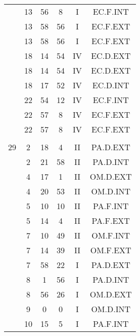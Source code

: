 \documentclass[12pt, a4paper]{article}
\begin{document}
\begin{multicols}{3}
{\begin{tabular}{c c c c c c}
	 	 	 	 & 13 & 56 & 8 & I & EC.F.INT\\%
	 	 	 	 & 13 & 58 & 56 & I & EC.F.EXT\\%
	 	 	 	 & 13 & 58 & 56 & I & EC.F.EXT\\%
	 	 	 	 & 18 & 14 & 54 & IV & EC.D.EXT\\%
	 	 	 	 & 18 & 14 & 54 & IV & EC.D.EXT\\%
	 	 	 	 & 18 & 17 & 52 & IV & EC.D.INT\\%
	 	 	 	 & 22 & 54 & 12 & IV & EC.F.INT\\%
	 	 	 	 & 22 & 57 & 8 & IV & EC.F.EXT\\%
	 	 	 	 & 22 & 57 & 8 & IV & EC.F.EXT\\%
	 	 	 	 & & & & & \\%
	 	 	 	29 & 2 & 18 & 4 & II & PA.D.EXT\\%
	 	 	 	 & 2 & 21 & 58 & II & PA.D.INT\\%
	 	 	 	 & 4 & 17 & 1 & II & OM.D.EXT\\%
	 	 	 	 & 4 & 20 & 53 & II & OM.D.INT\\%
	 	 	 	 & 5 & 10 & 10 & II & PA.F.INT\\%
	 	 	 	 & 5 & 14 & 4 & II & PA.F.EXT\\%
	 	 	 	 & 7 & 10 & 49 & II & OM.F.INT\\%
	 	 	 	 & 7 & 14 & 39 & II & OM.F.EXT\\%
	 	 	 	 & 7 & 58 & 22 & I & PA.D.EXT\\%
	 	 	 	 & 8 & 1 & 56 & I & PA.D.INT\\%
	 	 	 	 & 8 & 56 & 26 & I & OM.D.EXT\\%
	 	 	 	 & 9 & 0 & 0 & I & OM.D.INT\\%
	 	 	 	 & 10 & 15 & 5 & I & PA.F.INT\\%

\end{tabular}}
\end{multicols}
\end{document}
